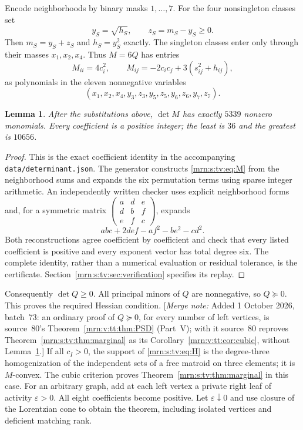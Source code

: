 \documentclass[11pt,a4paper]{article}
\newtheorem{lemma}[theorem]{Lemma}
\theoremstyle{remark}\newtheorem{remark}[theorem]{Remark}
\newcommand{\e}{\mathrm e}                 %
\newcommand{\mnote}[1]{[\textit{Merge note:} #1]}
\begin{document}
Encode neighborhoods by binary masks $1,\ldots,7$. For the four nonsingleton
classes set
\begin{equation}\label{mrn:s:tv:eq:moment}
 y_S=\sqrt{h_S},\qquad z_S=m_S-y_S\ge0.
\end{equation}
Then $m_S=y_S+z_S$ and $h_S=y_S^2$ exactly. The singleton classes enter only
through their masses $x_1,x_2,x_4$. Thus $M=6Q$ has entries
\begin{equation}\label{mrn:s:tv:eq:M}
 M_{ii}=4c_i^2,\qquad
 M_{ij}=-2c_ic_j+3(s_{ij}^2+h_{ij}),
\end{equation}
as polynomials in the eleven nonnegative variables
\[
 (x_1,x_2,x_4,y_3,z_3,y_5,z_5,y_6,z_6,y_7,z_7).
\]

\begin{lemma}\label{mrn:s:tv:lem:certificate}
After the substitutions above, $\det M$ has exactly $5339$ nonzero monomials.
Every coefficient is a positive integer; the least is $36$ and the greatest
is $10656$.
\end{lemma}
\begin{proof}
This is the exact coefficient identity in the accompanying
\texttt{data/determinant.json}. The generator constructs \eqref{mrn:s:tv:eq:M}
from the neighborhood sums and expands the six permutation terms using
sparse integer arithmetic. An independently written checker uses explicit
neighborhood forms and, for a symmetric matrix
$\left(\begin{smallmatrix}a&d&e\\d&b&f\\e&f&c\end{smallmatrix}\right)$, expands
\[
 abc+2def-af^2-be^2-cd^2.
\]
Both reconstructions agree coefficient by coefficient and check that every
listed coefficient is positive and every exponent vector has total degree six.
The complete identity, rather than a numerical evaluation or residual tolerance,
is the certificate. Section~\ref{mrn:s:tv:sec:verification} specifies its replay.
\end{proof}

Consequently $\det Q\ge0$. All principal minors of $Q$ are nonnegative, so
$Q\succeq0$. This proves the required Hessian condition.
\mnote{Added 1 October 2026, batch~73: an ordinary proof of $Q\succeq0$, for
every number of left vertices, is source~80's Theorem~\ref{mrn:v:tt:thm:PSD}
(Part~V); with it source~80 reproves Theorem~\ref{mrn:s:tv:thm:marginal} as
its Corollary~\ref{mrn:v:tt:cor:cubic}, without
Lemma~\ref{mrn:s:tv:lem:certificate}.}
If all $c_I>0$, the support of \eqref{mrn:s:tv:eq:H} is the degree-three homogenization
of the independent sets of a free matroid on three elements; it is $M$-convex.
The cubic criterion proves Theorem~\ref{mrn:s:tv:thm:marginal} in this case.
For an arbitrary graph, add at each left vertex a private right leaf of
activity $\varepsilon>0$. All eight coefficients become positive. Let
$\varepsilon\downarrow0$ and use closure of the Lorentzian cone to obtain
the theorem, including isolated vertices and deficient matching rank.
\end{document}
